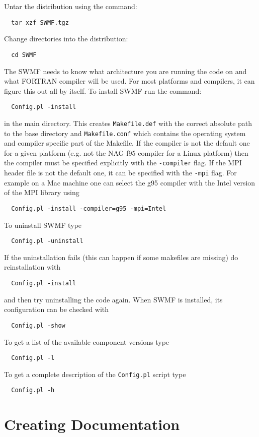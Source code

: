 Untar the distribution using the command:
\begin{verbatim}
  tar xzf SWMF.tgz
\end{verbatim}

Change directories into the distribution:
\begin{verbatim}
  cd SWMF
\end{verbatim}

The SWMF needs to know what architecture you are running the code on
and what FORTRAN compiler will be used.  For most platforms and compilers,
it can figure this out all by itself. To install SWMF run the command:
\begin{verbatim}
  Config.pl -install
\end{verbatim}
in the main directory. This creates {\tt Makefile.def} with
the correct absolute path to the base directory and {\tt Makefile.conf}
which contains the operating system and compiler specific part of
the Makefile. If the compiler is not the default one for a given
platform (e.g. not the NAG f95 compiler for a Linux platform) then
the compiler must be specified explicitly with the {\tt -compiler}
flag. If the MPI header file is not the default one, it can be
specified with the {\tt -mpi} flag. For example on a Mac machine
one can select the g95 compiler with the Intel version of the 
MPI library using
\begin{verbatim}
  Config.pl -install -compiler=g95 -mpi=Intel
\end{verbatim}
To uninstall SWMF type
\begin{verbatim}
  Config.pl -uninstall
\end{verbatim}
If the uninstallation fails (this can happen if some makefiles are missing)
do reinstallation with
\begin{verbatim}
  Config.pl -install
\end{verbatim}
and then try uninstalling the code again.
When SWMF is installed, its configuration can be checked with
\begin{verbatim}
  Config.pl -show
\end{verbatim}
To get a list of the available component versions type
\begin{verbatim}
  Config.pl -l
\end{verbatim}
To get a complete description of the {\tt Config.pl}  script type
\begin{verbatim}
  Config.pl -h
\end{verbatim}

\section{Creating Documentation}

